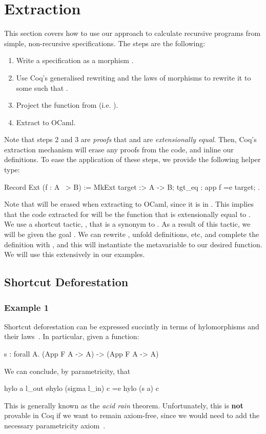 \documentclass[anonymous, a4paper, UKenglish, cleveref, autoref, thm-restate]{lipics-v2021}
\begin{document}
\section{Extraction}
This section covers how to use our approach to calculate recursive programs
from simple, non-recursive specifications. The steps are the following:
\begin{enumerate}
  \item Write a specification as a morphism .
  \item Use Coq's generalised rewriting and the laws of morphisms to 
    rewrite it to some  such that .
  \item Project the function  from 
    (i.e. ).
  \item Extract  to OCaml.
\end{enumerate}
Note that steps 2 and 3 are \emph{proofs} that  and  are
\emph{extensionally equal}. Then, Coq's extraction mechanism will erase any
proofs from the code, and inline our definitions. To ease the application of
these steps, we provide the following helper type:
\begin{coqcode}
  Record Ext (f : A ~> B) := 
    MkExt { target :> A -> B; tgt_eq : app f =e target; }.
\end{coqcode}
Note that  will be erased when extracting  to OCaml,
since it is in . This implies that the code extracted for 
will be the function  that is extensionally equal to .  We
use a shortcut tactic, , that is a synonym to 
. As a result of this tactic, we will be given the goal 
. We can rewrite , unfold definitions, etc, and
complete the definition with , and this will instantiate the
metavariable  to our desired function. We will use this extensively
in our examples.

\subsection{Shortcut Deforestation}

\subsubsection{Example 1}
Shortcut deforestation can be expressed succintly in terms of hylomorphisms and
their laws~\cite{TakanoM95}. In particular, given a function:
\begin{coqcode}
  s  : forall A. (App F A -> A) -> (App F A -> A)
\end{coqcode}
We can conclude, by parametricity, that
\begin{coqcode}
  hylo a l_out \o hylo (sigma l_in) c =e hylo (s a) c
\end{coqcode}
This is generally known as the \emph{acid rain} theorem. Unfortunately, this is
\textbf{not} provable in Coq if we want to remain axiom-free, since we would
need to add the necessary parametricity
axiom~\cite{keller_et_al:LIPIcs.CSL.2012.381}. 
\end{document}
